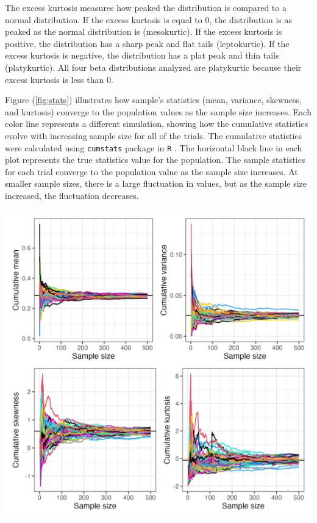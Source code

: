 \documentclass{article}\usepackage[]{graphicx}\usepackage[]{xcolor}
\newenvironment{Figure}
  {\par\medskip\noindent\minipage{\linewidth}}
  {\endminipage\par\medskip}
\begin{document}
\begin{multicols}{2}
The excess kurtosis measures how peaked the distribution is compared to a normal distribution. If the excess kurtosis is equal to 0, the distribution is as peaked as the normal distribution is (mesokurtic). If the excess kurtosis is positive, the distribution has a sharp peak and flat tails (leptokurtic). If the excess kurtosis is negative, the distribution has a plat peak and thin tails (platykurtic). All four beta distributions analyzed are platykurtic because their excess kurtosis is less than 0.

Figure (\ref{fig:stats}) illustrates how sample's statistics (mean, variance, skewness, and kurtosis) converge to the population values as the sample size increases. Each color line represents a different simulation, showing how the cumulative statistics evolve with increasing sample size for all of the trials. The cumulative statistics were calculated using \texttt{cumstats} package in \texttt{R} \citep{cumstats}. The horizontal black line in each plot represents the true statistics value for the population. The sample statistics for each trial converge to the population value as the sample size increases. At smaller sample sizes, there is a large fluctuation in values, but as the sample size increased, the fluctuation decreases.

\begin{Figure}
 \centering
 \includegraphics[width=\linewidth]{stats.png}
 \label{fig:stats}
\end{Figure}


\end{multicols}
\end{document}
